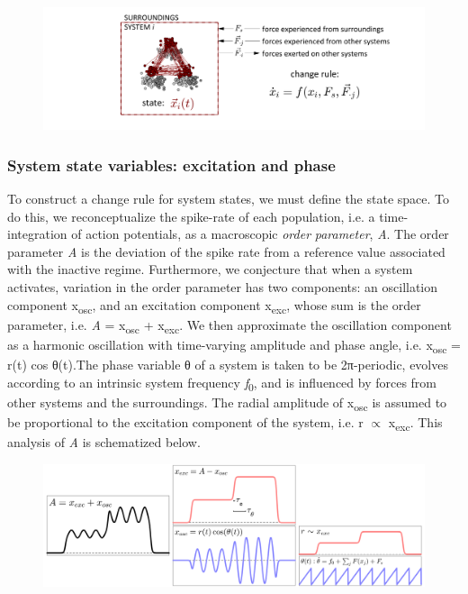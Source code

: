   
\begin{figure}
\includegraphics[width=\textwidth]{figures/Tilsen-img11.png}
\caption{\missingcaption}
\label{fig:}
\end{figure}
 

\subsubsection{System state variables: excitation and phase}

To construct a change rule for system states, we must define the state space. To do this, we reconceptualize the spike-rate of each population, i.e. a time-integration of action potentials, as a macroscopic \textit{order} \textit{parameter}, \textit{A}. The order parameter \textit{A} is the deviation of the spike rate from a reference value associated with the inactive regime. Furthermore, we conjecture that when a system activates, variation in the order parameter has two components: an oscillation component x\textsubscript{osc}, and an excitation component x\textsubscript{exc}, whose sum is the order parameter, i.e. \textit{A} = x\textsubscript{osc} + x\textsubscript{exc}. We then approximate the oscillation component as a harmonic oscillation with time-varying amplitude and phase angle, i.e. x\textsubscript{osc} = r(t) cos θ(t).The phase variable θ of a system is taken to be 2π{}-periodic, evolves according to an intrinsic system frequency \textit{f}\textsubscript{0}, and is influenced by forces from other systems and the surroundings. The radial amplitude of x\textsubscript{osc} is assumed to be proportional to the excitation component of the system, i.e. r  ${\propto}$ x\textsubscript{exc}. This analysis of \textit{A} is schematized below.  

  
\begin{figure}
\includegraphics[width=\textwidth]{figures/Tilsen-img12.png}
\caption{\missingcaption}
\label{fig:}
\end{figure}
 

